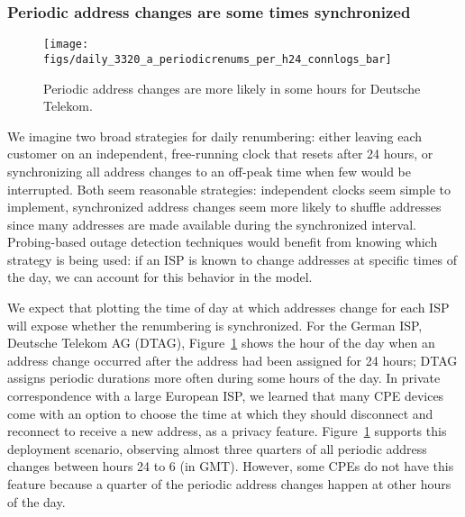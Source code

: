 
\subsubsection*{Periodic address changes are some times synchronized}


\begin{figure}[th]
  \centering
    \texttt{[image: figs/daily\_3320\_a\_periodicrenums\_per\_h24\_connlogs\_bar]}
  \caption{\label{fig:3320_renums_per_h24}Periodic address changes
    are more likely in some hours for Deutsche Telekom.}
\end{figure}

We imagine two broad strategies for daily renumbering:
either leaving each customer on an independent, free-running
clock that resets after 24 hours, or synchronizing all
address changes to an off-peak time when few would be
interrupted.  Both seem reasonable strategies: independent
clocks seem simple to implement, synchronized address
changes seem more likely to shuffle addresses since many
addresses are made available during the synchronized
interval.  Probing-based outage detection techniques would benefit from knowing which strategy
is being used: if an ISP is known to change addresses at specific
times of the day, we can account for this behavior in the model.

 We expect
that plotting the time of day at which addresses change for
each ISP will expose whether the renumbering is
synchronized. For the German ISP, Deutsche Telekom AG (DTAG), Figure~\ref{fig:3320_renums_per_h24} shows the hour of
the day when an address change occurred after the address had been
assigned for 24 hours; DTAG assigns periodic durations more often during some
hours of the day. In private correspondence with a large European ISP,
we learned that many CPE devices come with an option to choose the
time at which they should disconnect and reconnect to receive a new
address, as a privacy feature. Figure~\ref{fig:3320_renums_per_h24}
supports this deployment scenario, observing almost three quarters of
all periodic address changes between hours 24 to 6 (in GMT). However,
some CPEs do not have this feature because a quarter of the periodic
address changes happen at other hours of the day.

